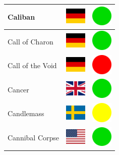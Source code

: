 \documentclass[12pt, a4paper, twoside]{report}
\begin{document}
\begin{center}
\begin{longtable}{|p{5cm}|p{2cm}|p{2cm}|}
 Caliban                                                    & \includegraphics[width=1cm]{../4x3/de} &   \includegraphics[width=1cm]{../likes/y} \\ \hline
 Call of Charon                                             & \includegraphics[width=1cm]{../4x3/de} &   \includegraphics[width=1cm]{../likes/y} \\ \hline
 Call of the Void                                           & \includegraphics[width=1cm]{../4x3/de} &   \includegraphics[width=1cm]{../likes/n} \\ \hline
 Cancer                                                     & \includegraphics[width=1cm]{../4x3/gb} &   \includegraphics[width=1cm]{../likes/y} \\ \hline
 Candlemass                                                 & \includegraphics[width=1cm]{../4x3/se} &   \includegraphics[width=1cm]{../likes/m} \\ \hline
 Cannibal Corpse                                            & \includegraphics[width=1cm]{../4x3/us} &   \includegraphics[width=1cm]{../likes/y} \\ \hline

\end{longtable}
\end{center}
\end{document}
